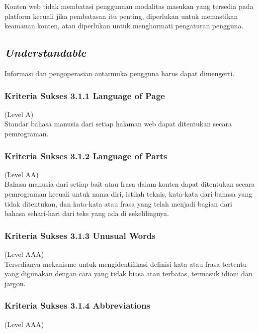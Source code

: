 Konten web tidak membatasi penggunaan modalitas masukan yang tersedia pada platform kecuali jika pembatasan itu penting, diperlukan untuk memastikan keamanan konten, atau diperlukan untuk menghormati pengaturan pengguna.

\subsection{\textit{Understandable}}
\label{subsec:understandable}
Informasi dan pengoperasian antarmuka pengguna harus dapat dimengerti.

\subsubsection{Kriteria Sukses 3.1.1 Language of Page}
\label{subsubsec:kriteria_3.1.1}
(Level A) \\

Standar bahasa manusia dari setiap halaman web dapat ditentukan secara pemrograman.

\subsubsection{Kriteria Sukses 3.1.2 Language of Parts}
\label{subsubsec:kriteria_3.1.2}
(Level AA) \\

Bahasa manusia dari setiap bait atau frasa dalam konten dapat ditentukan secara pemrograman kecuali untuk nama diri, istilah teknis, kata-kata dari bahasa yang tidak ditentukan, dan kata-kata atau frasa yang telah menjadi bagian dari bahasa sehari-hari dari teks yang ada di sekelilingnya.

\subsubsection{Kriteria Sukses 3.1.3 Unusual Words}
\label{subsubsec:kriteria_3.1.3}
(Level AAA) \\

Tersedianya mekanisme untuk mengidentifikasi definisi kata atau frasa tertentu yang digunakan dengan cara yang tidak biasa atau terbatas, termasuk idiom dan jargon.

\subsubsection{Kriteria Sukses 3.1.4 Abbreviations}
\label{subsubsec:kriteria_3.1.4}
(Level AAA) \\

